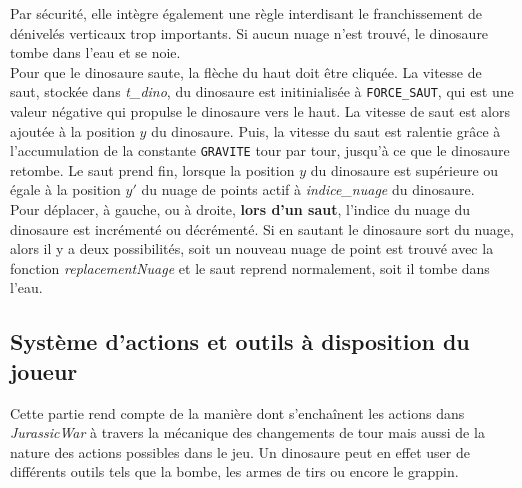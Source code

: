 \documentclass[11pt,a4paper]{article}
\begin{document}
Par sécurité, elle intègre également une règle interdisant le franchissement de dénivelés verticaux trop importants. Si aucun nuage n'est trouvé, le dinosaure tombe dans l'eau et se noie.\\ 
Pour que le dinosaure saute, la flèche du haut doit être cliquée. La vitesse de saut, stockée dans \textit{\mbox{t\_dino}}, du dinosaure est initinialisée à \texttt{FORCE\_SAUT}, qui est une valeur négative qui propulse le dinosaure vers le haut. La vitesse de saut est alors ajoutée à la position $y$ du dinosaure. Puis, la vitesse du saut est ralentie grâce à l'accumulation de la constante \texttt{GRAVITE} tour par tour, jusqu'à ce que le dinosaure retombe. Le saut prend fin, lorsque la position $y$ du dinosaure est supérieure ou égale à la position $y'$ du nuage de points actif à \textit{\mbox{indice\_nuage}} du dinosaure.\\ 
Pour déplacer, à gauche, ou à droite, \textbf{lors d'un saut}, l'indice du nuage du dinosaure est incrémenté ou décrémenté. Si en sautant le dinosaure sort du nuage, alors il y a deux possibilités, soit un nouveau nuage de point est trouvé avec la fonction \textit{\mbox{replacementNuage}} et le saut reprend normalement, soit il tombe dans l'eau.

\subsection{Système d’actions et outils à disposition du joueur}
Cette partie rend compte de la manière dont s'enchaînent les actions dans \textit{JurassicWar} à travers la mécanique des changements de tour mais aussi de la nature des actions possibles dans le jeu. Un dinosaure peut en effet user de différents outils tels que la bombe, les armes de tirs ou encore le grappin. 
\end{document}
